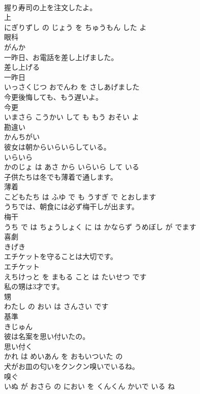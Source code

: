 \documentclass[8pt]{extreport}
\begin{document}
\begin{CJK}{UTF8}{min}
\\	握り寿司の上を注文したよ。	
\\	上 
\\	にぎりずし の じょう を ちゅうもん した よ			
\\	眼科	
\\	がんか			
\\	一昨日、お電話を差し上げました。	
\\	差し上げる 
\\	一昨日 
\\	いっさくじつ おでんわ を さしあげました			
\\	今更後悔しても、もう遅いよ。	
\\	今更 
\\	いまさら こうかい して も もう おそい よ			
\\	勘違い	
\\	かんちがい			
\\	彼女は朝からいらいらしている。	
\\	いらいら 
\\	かのじょ は あさ から いらいら して いる			
\\	子供たちは冬でも薄着で通します。	
\\	薄着 
\\	こどもたち は ふゆ で も うすぎ で とおします			
\\	うちでは、朝食には必ず梅干しが出ます。	
\\	梅干 
\\	うち で は ちょうしょく に は かならず うめぼし が でます			
\\	喜劇	
\\	きげき			
\\	エチケットを守ることは大切です。	
\\	エチケット 
\\	えちけっと を まもる こと は たいせつ です			
\\	私の甥は3才です。	
\\	甥 
\\	わたし の おい は さんさい です			
\\	基準	
\\	きじゅん			
\\	彼は名案を思い付いたの。	
\\	思い付く 
\\	かれ は めいあん を おもいついた の			
\\	犬がお皿の匂いをクンクン嗅いでいるね。	
\\	嗅ぐ 
\\	いぬ が おさら の におい を くんくん かいで いる ね			

\end{CJK}
\end{document}
